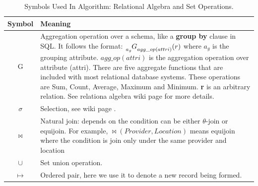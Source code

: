 \begin{table}[!ht]
\begin{center}\caption{Symbols Used In Algorithm: Relational Algebra and Set Operations.} \label{table:relational_algebra_set}
\begin{tabular}{|c|p{10cm}|}
\hline
\textbf{Symbol }& \textbf{Meaning } \\
\hline 
G & 
    Aggregation operation over a schema, like a \textbf{group by} clause in SQL.
    It follows the format:
    $\tensor[_{a_g}]{G}{_{agg\_op(attri)}} (r)$
    where $a_g$ is the grouping attribute.
    $agg\_op(attri)$ is the aggregation operation over attribute (attri). 
    There are five aggregate functions that are included with most relational database systems.
    These operations are Sum, Count, Average, Maximum and Minimum.
    \textbf{r} is an arbitrary relation.
    See relationa algebra wiki page \cite{ref36} for more details.\\
    
\hline $\sigma $ &  Selection, see wiki page \cite{ref36}.\\
\hline $\bowtie$ & Natural join: depends on the condition can be either $\theta$-join or equijoin. For example, $\bowtie(Provider,Location)$ means equijoin where the condition is join only under the same provider and location\\
\hline  $ \cup$  & Set union operation. \\
\hline $\mapsto $ & Ordered pair, here we use it to denote a new record being formed.\\
\hline
\end{tabular}
\end{center}
\end{table}

